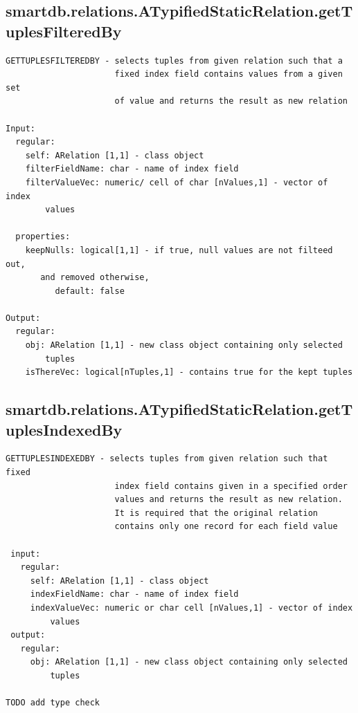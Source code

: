 \documentclass[letterpaper,10pt,english]{sphinxmanual}
\begin{document}
\subsection{smartdb.relations.ATypifiedStaticRelation.getTuplesFilteredBy}
\label{chap_functions:smartdb-relations-atypifiedstaticrelation-gettuplesfilteredby}
\begin{Verbatim}[commandchars=\\\{\}]
GETTUPLESFILTEREDBY - selects tuples from given relation such that a
                      fixed index field contains values from a given set
                      of value and returns the result as new relation

Input:
  regular:
    self: ARelation [1,1] - class object
    filterFieldName: char - name of index field
    filterValueVec: numeric/ cell of char [nValues,1] - vector of index
        values

  properties:
    keepNulls: logical[1,1] - if true, null values are not filteed out,
       and removed otherwise,
          default: false

Output:
  regular:
    obj: ARelation [1,1] - new class object containing only selected
        tuples
    isThereVec: logical[nTuples,1] - contains true for the kept tuples
\end{Verbatim}


\subsection{smartdb.relations.ATypifiedStaticRelation.getTuplesIndexedBy}
\label{chap_functions:smartdb-relations-atypifiedstaticrelation-gettuplesindexedby}
\begin{Verbatim}[commandchars=\\\{\}]
 GETTUPLESINDEXEDBY - selects tuples from given relation such that fixed
                      index field contains given in a specified order
                      values and returns the result as new relation.
                      It is required that the original relation
                      contains only one record for each field value

 input:
   regular:
     self: ARelation [1,1] - class object
     indexFieldName: char - name of index field
     indexValueVec: numeric or char cell [nValues,1] - vector of index
         values
 output:
   regular:
     obj: ARelation [1,1] - new class object containing only selected
         tuples

TODO add type check
\end{Verbatim}
\end{document}
